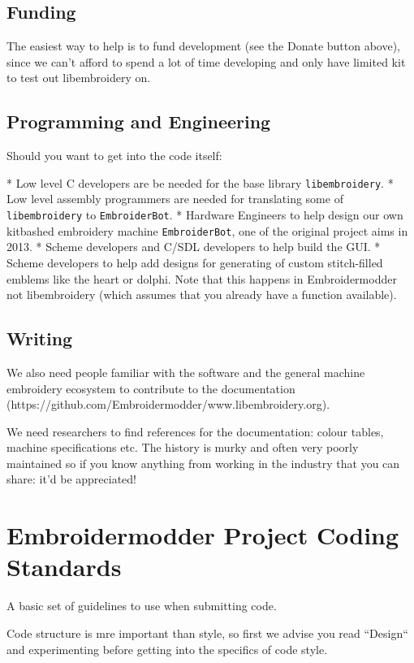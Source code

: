 \documentclass[a4paper]{report}
\begin{document}
\subsection{Funding}

The easiest way to help is to fund development (see the Donate button above),
since we can't afford to spend a lot of time developing and only have limited
kit to test out libembroidery on.

\subsection{Programming and Engineering}

Should you want to get into the code itself:

* Low level C developers are be needed for the base library \texttt{libembroidery}.
* Low level assembly programmers are needed for translating some of \texttt{libembroidery} to \texttt{EmbroiderBot}.
* Hardware Engineers to help design our own kitbashed embroidery machine \texttt{EmbroiderBot}, one of the original project aims in 2013.
* Scheme developers and C/SDL developers to help build the GUI.
* Scheme developers to help add designs for generating of custom stitch-filled emblems like the heart or dolphi. Note that this happens in Embroidermodder not libembroidery (which assumes that you already have a function available).

\subsection{Writing}

We also need people familiar with the software and the general
machine embroidery ecosystem to contribute to the
documentation (https://github.com/Embroidermodder/www.libembroidery.org).

We need researchers to find references for the documentation: colour tables,
machine specifications etc. The history is murky and often very poorly maintained
so if you know anything from working in the industry that you can share: it'd be
appreciated!

\section{Embroidermodder Project Coding Standards}

A basic set of guidelines to use when submitting code.

Code structure is mre important than style, so first we advise you read
``Design`` and experimenting before getting into the specifics of code style.
\end{document}
